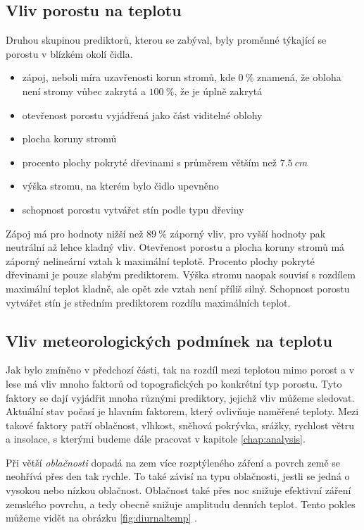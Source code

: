 \subsection{Vliv porostu na teplotu}
Druhou skupinou prediktorů, kterou se \parencite{ZellwegerFlorian2019Sdou} zabýval, byly proměnné týkající se porostu v blízkém okolí čidla.
\begin{itemize}
	\item zápoj, neboli míra uzavřenosti korun stromů, kde $\SI{0}{\%}$ znamená, že obloha není stromy vůbec zakrytá a $\SI{100}{\%}$, že je úplně zakrytá
	\item otevřenost porostu vyjádřená jako část viditelné oblohy
	\item plocha koruny stromů
	\item procento plochy pokryté dřevinami s průměrem větším než $\SI{7.5}{cm}$
	\item výška stromu, na kterém bylo čidlo upevněno
	\item schopnost porostu vytvářet stín podle typu dřeviny
\end{itemize}
Zápoj má pro hodnoty nižší než $\SI{89}{\%}$ záporný vliv, pro vyšší hodnoty pak neutrální až lehce kladný vliv. Otevřenost porostu a plocha koruny stromů má záporný nelineární vztah k maximální teplotě. Procento plochy pokryté dřevinami je pouze slabým prediktorem. Výška stromu naopak souvisí s rozdílem maximální teplot kladně, ale opět zde vztah není příliš silný. Schopnost porostu vytvářet stín je středním prediktorem rozdílu maximálních teplot.

\subsection{Vliv meteorologických podmínek na teplotu}\label{chap:vlivmeteo}
Jak bylo zmíněno v předchozí části, tak na rozdíl mezi teplotou mimo porost a v lese má vliv mnoho faktorů od topografických po konkrétní typ porostu. Tyto faktory se dají vyjádřit mnoha různými prediktory, jejichž vliv můžeme sledovat. Aktuální stav počasí je hlavním faktorem, který ovlivňuje naměřené teploty. Mezi takové faktory patří oblačnost, vlhkost, sněhová pokrývka, srážky, rychlost větru a insolace, s kterými budeme dále pracovat v kapitole \ref{chap:analysis}.

Při větší \textit{oblačnosti} dopadá na zem více rozptýleného záření a povrch země se neohřívá přes den tak rychle. To také závisí na typu oblačnosti, jestli se jedná o vysokou nebo nízkou oblačnost. Oblačnost také přes noc snižuje efektivní záření zemského povrchu, a tedy obecně snižuje amplitudu denních teplot. Tento pokles můžeme vidět na obrázku \ref{fig:diurnaltemp} \parencite{arya2001}.

